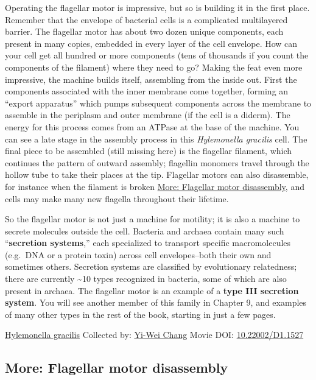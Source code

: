 \documentclass[]{tufte-book}
\begin{document}
Operating the flagellar motor is impressive, but so is building it in the first place. Remember that the envelope of bacterial cells is a complicated multilayered barrier. The flagellar motor has about two dozen unique components, each present in many copies, embedded in every layer of the cell envelope. How can your cell get all hundred or more components (tens of thousands if you count the components of the filament) where they need to go? Making the feat even more impressive, the machine builds itself, assembling from the inside out. First the components associated with the inner membrane come together, forming an ``export apparatus'' which pumps subsequent components across the membrane to assemble in the periplasm and outer membrane (if the cell is a diderm). The energy for this process comes from an ATPase at the base of the machine. You can see a late stage in the assembly process in this \emph{Hylemonella gracilis} cell. The final piece to be assembled (still missing here) is the flagellar filament, which continues the pattern of outward assembly; flagellin monomers travel through the hollow tube to take their places at the tip. Flagellar motors can also disassemble, for instance when the filament is broken \protect\hyperlink{Flagellar_motor_disassembly}{More: Flagellar motor disassembly}, and cells may make many new flagella throughout their lifetime.

So the flagellar motor is not just a machine for motility; it is also a machine to secrete molecules outside the cell. Bacteria and archaea contain many such ``\textbf{secretion systems},'' each specialized to transport specific macromolecules (e.g.~DNA or a protein toxin) across cell envelopes--both their own and sometimes others. Secretion systems are classified by evolutionary relatedness; there are currently \textasciitilde{}10 types recognized in bacteria, some of which are also present in archaea. The flagellar motor is an example of a \textbf{type III secretion system}. You will see another member of this family in Chapter 9, and examples of many other types in the rest of the book, starting in just a few pages.



\hypertarget{htmlwidget-6448edae39c05e45e9f7}{}

\label{fig:6-3}\protect\hyperlink{tree}{Hylemonella gracilis} Collected by: \protect\hyperlink{yi-wei_chang}{Yi-Wei Chang} Movie DOI: \href{https://doi.org/10.22002/D1.1527}{10.22002/D1.1527}

\hypertarget{Flagellar_motor_disassembly}{%
\subsection*{More: Flagellar motor disassembly}\label{Flagellar_motor_disassembly}}
\end{document}
